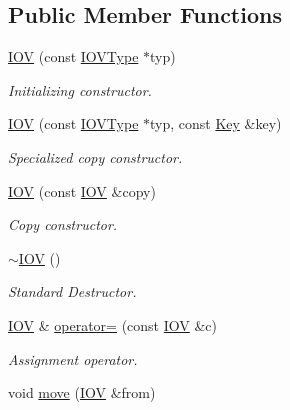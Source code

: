 \subsection*{Public Member Functions}
\begin{DoxyCompactItemize}
\item 
\hyperlink{class_d_d4hep_1_1_i_o_v_a0a32eb684174feeec7047c7fe4d351cb}{IOV} (const \hyperlink{class_d_d4hep_1_1_i_o_v_type}{IOVType} $\ast$typ)
\begin{DoxyCompactList}\small\item\em Initializing constructor. \item\end{DoxyCompactList}\item 
\hyperlink{class_d_d4hep_1_1_i_o_v_a1744cedccf7a479d152c842f7fc5220a}{IOV} (const \hyperlink{class_d_d4hep_1_1_i_o_v_type}{IOVType} $\ast$typ, const \hyperlink{class_d_d4hep_1_1_i_o_v_a07cb46dc875296dc9cccf4ff370104ae}{Key} \&key)
\begin{DoxyCompactList}\small\item\em Specialized copy constructor. \item\end{DoxyCompactList}\item 
\hyperlink{class_d_d4hep_1_1_i_o_v_aa10ef137157d26b5af800d45ed69fcab}{IOV} (const \hyperlink{class_d_d4hep_1_1_i_o_v}{IOV} \&copy)
\begin{DoxyCompactList}\small\item\em Copy constructor. \item\end{DoxyCompactList}\item 
\hyperlink{class_d_d4hep_1_1_i_o_v_ae9f9e2f904e4d89e13615ddd03e365ba}{$\sim$IOV} ()
\begin{DoxyCompactList}\small\item\em Standard Destructor. \item\end{DoxyCompactList}\item 
\hyperlink{class_d_d4hep_1_1_i_o_v}{IOV} \& \hyperlink{class_d_d4hep_1_1_i_o_v_a3e52be5e863dcb3e84549dd309da9878}{operator=} (const \hyperlink{class_d_d4hep_1_1_i_o_v}{IOV} \&c)
\begin{DoxyCompactList}\small\item\em Assignment operator. \item\end{DoxyCompactList}\item 
void \hyperlink{class_d_d4hep_1_1_i_o_v_aa473ed270d7b0e3930b2654406233a3c}{move} (\hyperlink{class_d_d4hep_1_1_i_o_v}{IOV} \&from)

\end{DoxyCompactItemize}
